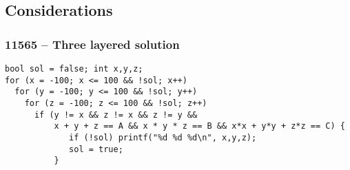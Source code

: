 \documentclass{beamer}
\begin{document}
\subsection{Considerations}








\begin{frame}
  \frametitle{11565 -- Three layered solution}
{\smaller
\begin{verbatim}
bool sol = false; int x,y,z;
for (x = -100; x <= 100 && !sol; x++)
  for (y = -100; y <= 100 && !sol; y++)
    for (z = -100; z <= 100 && !sol; z++)
      if (y != x && z != x && z != y &&
          x + y + z == A && x * y * z == B && x*x + y*y + z*z == C) {
             if (!sol) printf("%d %d %d\n", x,y,z);
             sol = true;
          }
\end{verbatim}
}
\end{frame}




\end{document}
